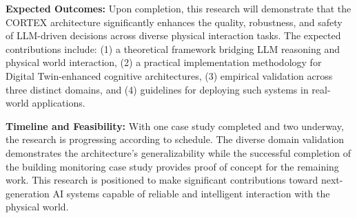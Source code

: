 \textbf{Expected Outcomes:} Upon completion, this research will demonstrate that the CORTEX architecture significantly enhances the quality, robustness, and safety of LLM-driven decisions across diverse physical interaction tasks. The expected contributions include: (1) a theoretical framework bridging LLM reasoning and physical world interaction, (2) a practical implementation methodology for Digital Twin-enhanced cognitive architectures, (3) empirical validation across three distinct domains, and (4) guidelines for deploying such systems in real-world applications.

\textbf{Timeline and Feasibility:} With one case study completed and two underway, the research is progressing according to schedule. The diverse domain validation demonstrates the architecture's generalizability while the successful completion of the building monitoring case study provides proof of concept for the remaining work. This research is positioned to make significant contributions toward next-generation AI systems capable of reliable and intelligent interaction with the physical world.